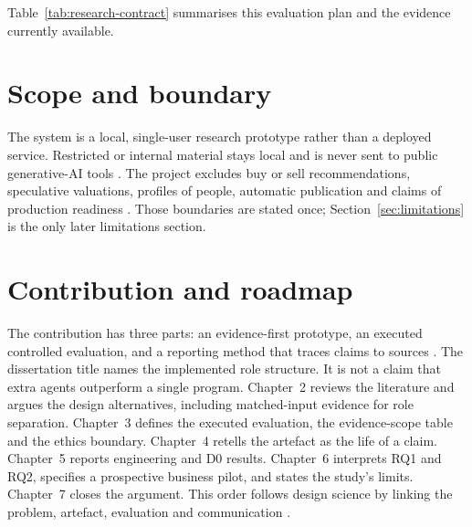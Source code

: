 Table~\ref{tab:research-contract} summarises this evaluation plan and the evidence currently available.



\section{Scope and boundary}

The system is a local, single-user research prototype rather than a deployed service. Restricted or
internal material stays local and is never sent to public generative-AI tools
\citep{cddo2023genai,nist2023airmf}. The project excludes buy or sell recommendations, speculative
valuations, profiles of people, automatic publication and claims of production readiness
\citep{fca2024promotions,greshake2023indirect}. Those boundaries are stated once;
Section~\ref{sec:limitations} is the only later limitations section.

\section{Contribution and roadmap}

The contribution has three parts: an evidence-first prototype, an executed controlled evaluation, and
a reporting method that traces claims to sources \citep{hevner2004design,peffers2007dsrm}. The
dissertation title names the implemented role structure. It is not a claim that extra agents
outperform a single program. Chapter~2 reviews the literature and argues the design alternatives,
including matched-input evidence for role separation. Chapter~3 defines the executed evaluation, the
evidence-scope table and the ethics boundary. Chapter~4 retells the artefact as the life of a claim.
Chapter~5 reports engineering and D0 results. Chapter~6 interprets RQ1 and RQ2, specifies a
prospective business pilot, and states the study's limits. Chapter~7 closes the argument. This order
follows design science by linking the problem, artefact, evaluation and communication
\citep{hevner2004design,peffers2007dsrm}.
